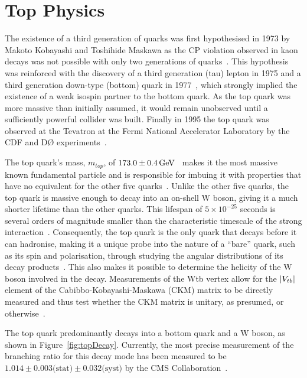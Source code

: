 \section{Top Physics}\label{sec:top-physics}
The existence of a third generation of quarks was first hypothesised in 1973 by Makoto Kobayashi and Toshihide Maskawa as the CP violation observed in kaon decays was not possible with only two generations of quarks~\cite{Kobayashi:1973fv}.
This hypothesis was reinforced with the discovery of a third generation (tau) lepton in 1975 and a third generation down-type (bottom) quark in 1977~\cite{Herb:1977ek}, which strongly implied the existence of a weak isospin partner to the bottom quark.
As the top quark was more massive than initially assumed, it would remain unobserved until a sufficiently powerful collider was built.
Finally in 1995 the top quark was observed at the Tevatron at the Fermi National Accelerator Laboratory by the CDF and D\O\xspace experiments~\cite{Abe:1995hr,D0:1995jca}.

The top quark's mass, $m_{top}$, of $173.0 \pm 0.4 \,\text{Ge\hspace{-.08em}V}$~\cite{Tanabashi:2018oca} makes it the most massive known fundamental particle and is responsible for imbuing it with properties that have no equivalent for the other five quarks~\cite{Tanabashi:2018oca}.
Unlike the other five quarks, the top quark is massive enough to decay into an on-shell W boson, giving it a much shorter lifetime than the other quarks.
This lifespan of $5 \times 10^{-25}$ seconds is several orders of magnitude smaller than the characteristic timescale of the strong interaction~\cite{Quadt}.
Consequently, the top quark is the only quark that decays before it can hadronise, making it a unique probe into the nature of a ``bare'' quark, such as its spin and polarisation, through studying the angular distributions of its decay products~\cite{Khachatryan:2015dzz}.
This also makes it possible to determine the helicity of the W boson involved in the decay.
Measurements of the Wtb vertex allow for the $\lvert V_{tb} \rvert$ element of the Cabibbo-Kobayashi-Maskawa (CKM) matrix to be directly measured and thus test whether the CKM matrix is unitary, as presumed, or otherwise~\cite{Shibata:2008sy}.

The top quark predominantly decays into a bottom quark and a W boson, as shown in Figure~\ref{fig:topDecay}.
Currently, the most precise measurement of the branching ratio for this decay mode has been measured to be $1.014 \pm 0.003 \textrm{(stat)} \pm 0.032 \textrm{(syst)}$ by the CMS Collaboration~\cite{Khachatryan:2014nda}.

